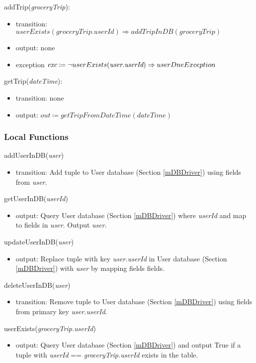 \documentclass[12pt, titlepage]{article}
\begin{document}
\noindent addTrip(\textit{groceryTrip}):
\begin{itemize}
\item transition: \( userExists(\textit{groceryTrip.userId}) \Rightarrow addTripInDB(\textit{groceryTrip})\) 
\item output: none
\item exception \( \textit{exc} \coloneqq \neg userExists(\textit{user.userId}) \Rightarrow \\ userDneException\)
\end{itemize}

\noindent getTrip(\textit{dateTime}):
\begin{itemize}
\item transition: none
\item output: \( \textit{out} \coloneqq getTripFromDateTime(\textit{dateTime}) \)
\end{itemize}

\subsubsection{Local Functions}
addUserInDB(\textit{user})
\begin{itemize}
\item transition: Add tuple to User database (Section \ref{mDBDriver}) using fields from \textit{user}.
\end{itemize}

\noindent getUserInDB(\textit{userId})
\begin{itemize}
\item output:  Query User database (Section \ref{mDBDriver}) where \textit{userId} and map to fields in \textit{user}. Output \textit{user}.
\end{itemize}

\noindent updateUserInDB(\textit{user})
\begin{itemize}
\item output:  Replace tuple with key \textit{user.userId} in User database (Section \ref{mDBDriver}) with \textit{user} by mapping fields fields.
\end{itemize}

\noindent deleteUserInDB(\textit{user})
\begin{itemize}
\item transition: Remove tuple to User database (Section \ref{mDBDriver}) using fields from primary key \textit{user.userId}.
\end{itemize}

\noindent userExists(\textit{groceryTrip.userId})
\begin{itemize}
\item output: Query User database (Section \ref{mDBDriver}) and output True if a tuple with \textit{userId} == \textit{groceryTrip.userId} exists in the table.
\end{itemize}
\end{document}
